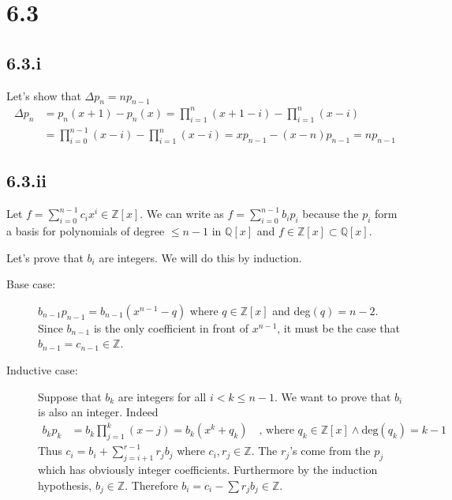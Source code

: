 \documentclass[12pt,a4paper]{article}
\newcommand {\polyf}{\mathbb{Z}[x]}
\begin{document}
\section*{6.3}
\subsection*{6.3.i}
Let's show that $\Delta p_n = n p_{n-1}$
\[
\begin{split}
    \Delta p_n &= p_n(x+1) - p_n(x) = \prod_{i = 1}^{n}(x + 1 - i) - \prod_{i = 1}^{n}(x - i)\\
               &= \prod_{i = 0}^{n-1}(x-i) - \prod_{i = 1}^{n}(x - i) = xp_{n-1} - (x-n)p_{n-1} = np_{n-1}
\end{split}
\]

\subsection*{6.3.ii}
Let $f = \sum_{i=0}^{n-1}c_i x^i \in \polyf$.
We can write as $f = \sum_{i = 0}^{n - 1}b_i p_i$ because the $p_i$ form a basis for polynomials of degree $\leq n - 1$ in $\mathbb{Q}[x]$ and $f\in \mathbb{Z}[x] \subset \mathbb{Q}[x]$.

Let's prove that $b_i$ are integers. We will do this by induction.
\begin{description}
    \item[Base case:] $b_{n-1}p_{n-1} = b_{n-1}(x^{n-1} - q)$  where $q \in \polyf$ and deg$(q) = n-2$.
        Since $b_{n-1}$ is the only coefficient in front of $x^{n-1}$, it must be the case that $b_{n-1} = c_{n-1} \in \mathbb{Z}$.
    \item[Inductive case:] Suppose that $b_k$ are integers for all $i < k \leq n-1$. We want to prove that $b_i$ is also an integer.
        Indeed
        \[
            \begin{split}
                b_k p_k &= b_k \prod_{j = 1}^{k} (x - j) = b_k(x^k + q_k) \quad \mbox{, where }q_k\in \polyf \land \mathrm{deg}(q_k) = k-1
            \end{split}
        \]
        Thus $c_i = b_i + \sum_{j = i+1}^{r-1}r_j b_j$ where $c_i,r_j \in \mathbb{Z}$.
        The $r_j$'s come from the $p_j$ which has obviously integer coefficients.
        Furthermore by the induction hypothesis, $b_j \in \mathbb{Z}$.
        Therefore $b_i = c_i - \sum r_jb_j \in \mathbb{Z}$.
\end{description}
\end{document}
